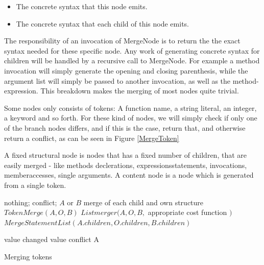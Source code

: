 \documentclass[11pt]{article}
\begin{document}
\begin{itemize}
   \item The concrete syntax that this node emits.
   \item The concrete syntax that each child of this node emits.
\end{itemize}

The responsibility of an invocation of MergeNode is to return the the exact syntax needed for these specific node. Any work of generating concrete syntax for children will be handled by a recursive call to MergeNode. For example a method invocation will simply generate the opening and closing parenthesis, while the argument list will simply be passed to another invocation, as well as the method-expression. This breakdown makes the merging of most nodes quite trivial.

Some nodes only consists of tokens: A function name, a string literal, an integer, a keyword and so forth. For these kind of nodes, we will simply check if only one of the branch nodes differs, and if this is the case, return that, and otherwise return a conflict, as can be seen in Figure \ref{MergeToken}


\begin{algorithm}
\caption{A fixed structural node is nodes that has a fixed number of children, that are easily merged - like methods declerations, expressionsstatements, invocations, memberaccesses, single arguments. A content node is a node which is generated from a single token.}
\label{MergeNode}
\begin{algorithmic}
            \State \Return nothing;
        \Else
            \State \Return conflict;
        \EndIf
    \EndIf
        \State \Return $A$ or $B$
    \EndIf
        \State \Return merge of each child and own structure
    \EndIf
        \State \Return $TokenMerge(A, O, B)$
    \EndIf
        \State \Return $Listmerger(A, O, B, $ appropriate cost function $)$
    \EndIf
        \State \Return $MergeStatementList(A.children, O.children, B.children)$
    \EndIf
\EndFunction
\end{algorithmic}
\end{algorithm}


\begin{algorithm}
\begin{algorithmic}
        \State \Return value
    \EndIf
        \State \Return changed value
    \EndIf
            \State \Return conflict
	    \EndIf
        \State \Return A
    \EndIf
\EndFunction
\end{algorithmic}
  \caption{Merging tokens}
  \label{MergeToken}
\end{algorithm}
\end{document}
